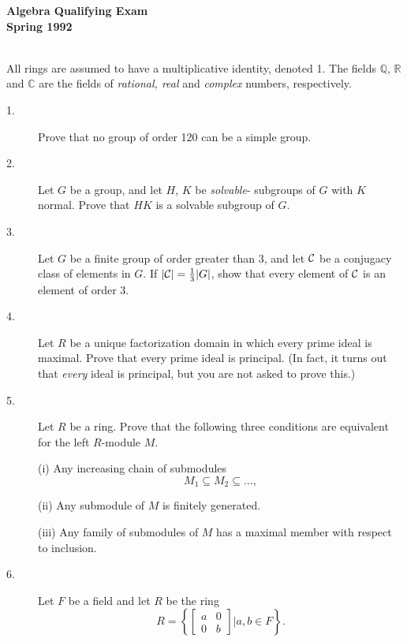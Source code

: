 \documentclass{article}
\def\R{\mathbb R}
\def\C{\mathbb C}
\def\Q{\mathbb Q}
\begin{document}


\begin{center}\begin{LARGE}
{\bf Algebra Qualifying Exam}\\ 
{\bf Spring 1992}\\ \end{LARGE}
\end{center}
\vspace{0.1in}
\noindent\hrulefill\\
All rings are assumed to have a multiplicative identity, denoted 1. The
fields $\Q$, $\R$ and $\C$ are the fields of {\it rational, real} and
{\it complex} numbers, respectively.

\begin{description}

\item[1.]
Prove that no group of order 120 can be a simple group.

\item[2.]
Let $G$ be a group, and let $H$, $K$ be {\it solvable}- subgroups of $G$
with $K$ normal. Prove that $HK$ is a solvable subgroup of $G$.

\item[3.]
Let $G$ be a finite group of order greater than 3, and let $\cal C$ be a
conjugacy class of elements in $G$. If $|{\cal C}| = \frac{1}{3} |G|$, show
that every element of $\cal C$ is an element of order 3.

\item[4.]
Let $R$ be a unique factorization domain in which every prime ideal is
maximal. Prove that every prime ideal is principal. (In fact, it turns out
that {\it every} ideal is principal, but you are not asked to prove this.)

\item[5.]
Let $R$ be a ring. Prove that the following three conditions are equivalent
for the left $R$-module $M$.

\item[\quad] (i)
Any increasing chain of submodules
$$M_1 \subseteq M_2 \subseteq \dots,$$

\item[\quad] (ii)
Any submodule of $M$ is finitely generated.

\item[\quad] (iii)
Any family of submodules of $M$ has a maximal member with respect to inclusion.

\item[6.]
Let $F$ be a field and let $R$ be the ring
$$R= \left\{ \begin{bmatrix} a&0 \\ 0&b \end{bmatrix} | a,b \in F \right\}.$$


\end{description}
\end{document}
